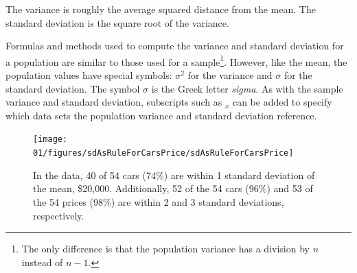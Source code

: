 \begin{termBox}{
The variance is roughly the average squared distance from the mean. The standard deviation is the square root of the variance.}
\end{termBox}

Formulas and methods used to compute the variance and standard deviation for a population are similar to those used for a sample\footnote{The only difference is that the population variance has a division by $n$ instead of $n-1$.}. However, like the mean, the population values have special symbols: $\sigma_{}^2$ for the variance and $\sigma$ for the standard deviation. The symbol $\sigma$ is the Greek letter \emph{sigma}. As with the sample variance and standard deviation, subscripts such as $_{x}^{}$ can be added to specify which data sets the population variance and standard deviation reference.
\begin{figure}
\centering
\texttt{[image: 01/figures/sdAsRuleForCarsPrice/sdAsRuleForCarsPrice]}
\caption{In the  data, 40 of 54 cars (74\%) are within 1 standard deviation of the mean, \$20,000. Additionally, 52 of the 54 cars (96\%) and 53 of the 54 prices (98\%) are within 2 and 3 standard deviations, respectively.}
\label{sdAsRuleForCarsPrice}
\end{figure}

